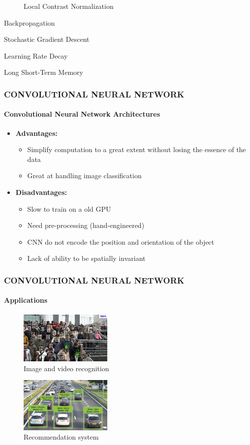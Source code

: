 \documentclass[11pt]{beamer}
\begin{document}
\begin{frame}
\begin{itemize}
\begin{minipage}{0.45\textwidth}
\begin{figure}[h!]
					\caption{Local Contrast Normalization}
				\end{figure}
			\end{minipage}
			\begin{minipage}{0.45\textwidth}
				\item Backpropagation
				\item Stochastic Gradient Descent
				\item Learning Rate Decay
				\item Long Short-Term Memory
			\end{minipage}
		\end{itemize}
	\end{frame}
	\begin{frame}
		\frametitle{\textbf{CONVOLUTIONAL NEURAL NETWORK}}
		\framesubtitle{Convolutional Neural Network Architectures}
		\begin{itemize}
			\item \textbf{Advantages:}
			\begin{itemize}
				\item Simplify computation to a great extent without losing the essence of the data
				\item Great at handling image classification
			\end{itemize}
			\item \textbf{Disadvantages:}
			\begin{itemize}
				\item Slow to train on a old GPU
				\item Need pre-processing (hand-engineered)
				\item CNN do not encode the position and orientation of the object
				\item Lack of ability to be spatially invariant
			\end{itemize}
		\end{itemize}
	\end{frame}
	\begin{frame}
		\frametitle{\textbf{CONVOLUTIONAL NEURAL NETWORK}}
		\framesubtitle{Applications} %
		\begin{figure}[h!]
			\includegraphics[width=0.4\textwidth]{ImgAndVidRecog1.jpg}
			\caption{Image and video recognition}
		\end{figure}
		\begin{figure}[h!]
			\includegraphics[width=0.4\textwidth]{ImgAndVidRecog2.jpg}
			\caption{Recommendation system}
		\end{figure}
	\end{frame}
\end{document}
